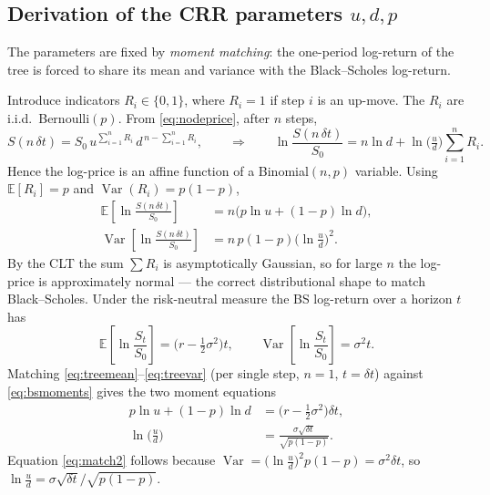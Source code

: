 \documentclass[11pt]{article}
\newcommand{\E}{\mathbb{E}}
\begin{document}
\subsection{Derivation of the CRR parameters \texorpdfstring{$u,d,p$}{u,d,p}}
The parameters are fixed by \emph{moment matching}: the one-period log-return of the tree is forced to share its mean and variance with the Black--Scholes log-return.

Introduce indicators $R_i\in\{0,1\}$, where $R_i=1$ if step $i$ is an up-move. The $R_i$ are i.i.d.\ Bernoulli$(p)$. From \eqref{eq:nodeprice}, after $n$ steps,
\[
S(n\,\delta t) = S_0\, u^{\sum_{i=1}^n R_i}\, d^{\,n-\sum_{i=1}^n R_i},
\qquad\Longrightarrow\qquad
\ln\frac{S(n\,\delta t)}{S_0} = n\ln d + \ln\!\Big(\tfrac{u}{d}\Big)\sum_{i=1}^n R_i .
\]
Hence the log-price is an affine function of a Binomial$(n,p)$ variable. Using $\E[R_i]=p$ and $\operatorname{Var}(R_i)=p(1-p)$,
\begin{align}
\E\!\left[\ln\frac{S(n\,\delta t)}{S_0}\right] &= n\big(p\ln u + (1-p)\ln d\big), \label{eq:treemean}\\
\operatorname{Var}\!\left[\ln\frac{S(n\,\delta t)}{S_0}\right] &= n\,p(1-p)\Big(\ln\tfrac{u}{d}\Big)^2. \label{eq:treevar}
\end{align}
By the CLT the sum $\sum R_i$ is asymptotically Gaussian, so for large $n$ the log-price is approximately normal --- the correct distributional shape to match Black--Scholes. Under the risk-neutral measure the BS log-return over a horizon $t$ has
\begin{equation}
\E\!\left[\ln\frac{S_t}{S_0}\right] = \Big(r-\tfrac12\sigma^2\Big)t,
\qquad
\operatorname{Var}\!\left[\ln\frac{S_t}{S_0}\right] = \sigma^2 t.
\label{eq:bsmoments}
\end{equation}
Matching \eqref{eq:treemean}--\eqref{eq:treevar} (per single step, $n=1$, $t=\delta t$) against \eqref{eq:bsmoments} gives the two moment equations
\begin{align}
p\ln u + (1-p)\ln d &= \Big(r-\tfrac12\sigma^2\Big)\delta t, \label{eq:match1}\\
\ln\!\Big(\frac{u}{d}\Big) &= \frac{\sigma\sqrt{\delta t}}{\sqrt{p(1-p)}}. \label{eq:match2}
\end{align}
Equation \eqref{eq:match2} follows because $\operatorname{Var}=\big(\ln\tfrac ud\big)^2 p(1-p)=\sigma^2\delta t$, so $\ln\tfrac ud = \sigma\sqrt{\delta t}/\sqrt{p(1-p)}$.
\end{document}
